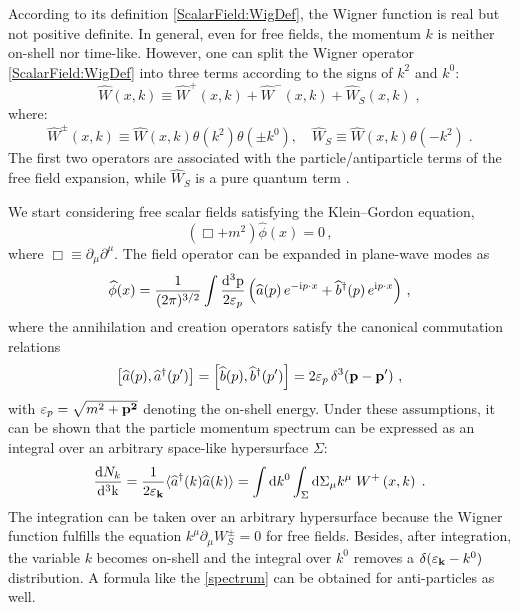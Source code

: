 \documentclass[prd,superscriptaddress,nofootinbib,notitlepage]{revtex4-1}
\def\wa{\widehat a}
\def\wad{\widehat a^{\dagger}}
\def\wb{\widehat b}
\def\wbd{\widehat b^{\dagger}}
\def\wphi{\widehat \phi}
\newcommand{\kk}{{\rm k}}
\newcommand{\pp}{{\rm p}}
\newcommand{\di}{{\rm d}}
\newcommand{\ii}{{\rm i}}
\begin{document}
According to its definition \eqref{ScalarField:WigDef}, the Wigner function is real but not positive definite. 
In general, even for free fields, the momentum $k$ is neither on-shell nor time-like. However, one can split the Wigner 
operator \eqref{ScalarField:WigDef} into three terms according to the signs of $k^2$ and $k^0$:
%
\begin{equation}\label{widecomp}
    \widehat W\left(x,k\right)\equiv \widehat W^+\left(x,k\right)+ \widehat W^-\left(x,k\right)+
    \widehat W_S\left(x,k\right)\; ,
\end{equation}
%
where:
%
\begin{equation*}
    \widehat W^\pm\left(x,k\right)\equiv \widehat W\left(x,k\right)\theta\left(k^2\right)
    \theta\left(\pm k^0\right),\quad \widehat W_S\equiv \widehat W\left(x,k\right)
    \theta\left(-k^2\right)\; .
\end{equation*}
%
The first two operators are associated with the particle/antiparticle terms of the free field expansion, 
while $\widehat W_S$ is a pure quantum term \cite{DeGroot:1980dk}.

We start considering free scalar fields satisfying the Klein--Gordon equation,
%
\begin{equation}\label{free kg}
    \left(\Box + m^2\right)\wphi(x) = 0 \, ,
\end{equation}
%
where $\Box \equiv \partial_\mu \partial^\mu$. The field operator can be expanded in plane-wave modes as
%
\begin{equation}\label{ScalarField:Expansion}
    \wphi(x)
    = \frac{1}{(2\pi)^{3/2}} \int \frac{\di^3\pp}{2\varepsilon_p}
    \left(
    \wa(p)\, e^{-\ii p \cdot x}
    + \wbd(p)\, e^{\ii p \cdot x}
    \right) \, ,
\end{equation}
%
where the annihilation and creation operators satisfy the canonical commutation relations
%
\begin{equation}\label{CommRelations}
    \left[\wa(p), \wad(p')\right]
    = \left[\wb(p), \wbd(p')\right]
    = 2\varepsilon_p\, \delta^3\!\left(\bf{p}-\bf{p}'\right) \, ,
\end{equation}
%
with $\varepsilon_p = \sqrt{m^2 + \bf{p}^2}$ denoting the on-shell energy. Under these assumptions, it can be shown that the particle momentum spectrum can be expressed as an integral over an arbitrary space-like hypersurface $\Sigma$:
%
\begin{equation}\label{spectrum}
    \frac{\di N_k}{\di^3 \kk} = \frac{1}{2\varepsilon_{\bf k}} \langle \wad(k) \wa(k) \rangle = 
    \int \di k^0 \int_\Sigma\di\Sigma_\mu k^\mu \; W^+\left(x,k\right) \;.
\end{equation}	
%
The integration can be taken over an arbitrary hypersurface because the Wigner function fulfills the equation
$k^\mu \partial_\mu W^\pm_S = 0$ for free fields. Besides, after integration, the variable $k$ becomes on-shell \cite{Becattini:2020sww} and the integral over $k^0$ removes a $\delta(\varepsilon_{\bf k} - k^0)$ distribution. 
A formula like the \eqref{spectrum} can be obtained for anti-particles as well. 
\end{document}
